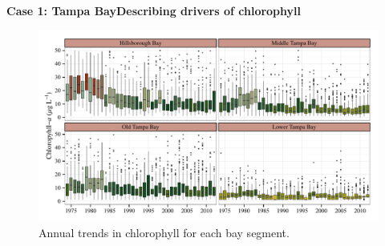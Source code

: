 \documentclass[serif]{beamer}\usepackage[]{graphicx}\usepackage[]{color}
\begin{document}
\begin{frame}{\textbf{Case 1: Tampa Bay}}{\textbf{Describing drivers of chlorophyll}}
\begin{figure}[!ht]


{\centering \includegraphics[width=\linewidth]{fig/annual_chl} 

}

\caption[Annual trends in chlorophyll for each bay segment]{Annual trends in chlorophyll for each bay segment.\label{fig:annual_chl}}
\end{figure}


\end{frame}

\end{document}

